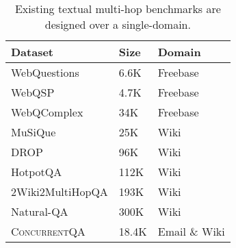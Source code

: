 \documentclass{article}
\renewcommand\cite{\citep}	\newcommand\shortcite{\citeyearpar}\newcommand\newcite{\citet}
\newcommand{\datasetname}{\textsc{ConcurrentQA}\xspace}
\begin{document}
\begin{table}[t]
\begin{center}
\begin{tabular}{p{6cm}p{0.75cm}p{2.75cm}}
\toprule
Dataset & Size & Domain \\
\midrule
WebQuestions \cite{berant2013webq} & 6.6K & Freebase \\
WebQSP   \cite{yih2016webqsp}   & 4.7K  & Freebase \\
WebQComplex \cite{talmor2018complexwebqa} & 34K   & Freebase \\
MuSiQue  \cite{trivedi2021musique}   & 25K & Wiki \\
DROP \cite{dua2019drop}& 96K          & Wiki \\
HotpotQA  \cite{yang2018hotpotqa} & 112K     & Wiki \\
2Wiki2MultiHopQA \cite{ho20202wikidataset} & 193K & Wiki \\
Natural-QA  \cite{47761} &  300K & Wiki \\
\midrule
\datasetname &   18.4K  & Email \& Wiki \\
\bottomrule
\end{tabular}
\caption{Existing textual multi-hop benchmarks are designed over a single-domain.}
\label{tab:mutlihopqa}
\end{center}
\end{table}
\end{document}
